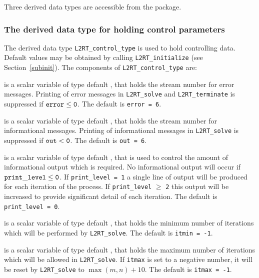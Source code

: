 \documentclass{galahad}
\newcommand{\packagename}{L2\-RT}
\begin{document}

\galtypes
Three derived data types are accessible from the package.


\subsubsection{The derived data type for holding control 
 parameters}\label{typecontrol}
The derived data type 
{\tt \packagename\_control\_type} 
is used to hold controlling data. Default values may be obtained by calling 
{\tt \packagename\_initialize}
(see Section~\ref{subinit}). The components of 
{\tt \packagename\_control\_type} 
are:

\begin{description}
 is a scalar variable of type default \integer, that holds the 
stream number for error messages. 
Printing of error messages in  
{\tt \packagename\_solve} and {\tt \packagename\_terminate} 
is suppressed if ${\tt error} \leq {\tt 0}$. 
The default is {\tt error = 6}.
 
 is a scalar variable of type default \integer, that holds the 
stream number for informational messages. 
Printing of informational messages in  
{\tt \packagename\_solve} is suppressed if ${\tt out} < {\tt 0}$. 
The default is {\tt out = 6}.
 
 is a scalar variable of type default \integer, 
that is used 
to control the amount of informational output which is required. No  
informational output will occur if ${\tt print\_level} \leq {\tt 0}$. If  
{\tt print\_level = 1} a single line of output will be produced for each 
iteration of the process. If {\tt print\_level} $\geq$ {\tt 2} this output 
will be increased to provide significant detail of each iteration. 
The default is {\tt print\_level = 0}.
 
 is a scalar variable of type default \integer, that holds the 
minimum number of iterations which will be performed by
{\tt \packagename\_solve}. 
The default is {\tt itmin = -1}.
 
 is a scalar variable of type default \integer, that holds the 
maximum number of iterations which will be allowed in 
{\tt \packagename\_solve}. 
If {\tt itmax} is set to a negative number, it will be reset by  
{\tt \packagename\_solve} to $\max(m,n)+10$. 
The default is {\tt itmax = -1}.
 

\end{description}
\end{document}
